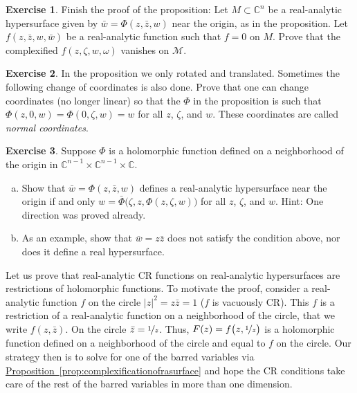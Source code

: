 \documentclass[12pt,openany]{book}
\newcommand{\sabs}[1]{\lvert {#1} \rvert}
\newcommand{\C}{{\mathbb{C}}}
\newcommand{\sM}{{\mathscr{M}}}
\newcommand{\myindex}[1]{#1\index{#1}}
\theoremstyle{plain}
\theoremstyle{remark}
\theoremstyle{definition}
\newenvironment{exbox}{%
    \def\FrameCommand{\vrule width 1pt \relax\hspace{10pt}}%
    \MakeFramed{\advance\hsize-\width\FrameRestore}%
}{%
    \endMakeFramed
}
\newenvironment{exparts}{%
    \leavevmode\begin{enumerate}[a),noitemsep,topsep=0pt,parsep=0pt,partopsep=0pt]
}{%
    \end{enumerate}
}
\theoremstyle{exercise}
\newtheorem{exercise}{Exercise}[section]
\theoremstyle{example}
\newcommand{\propref}[1]{\hyperref[#1]{Proposition~\ref*{#1}}}
\begin{document}
\begin{exbox}
\begin{exercise}
Finish the proof of the proposition:
Let $M\subset \C^n$ be a real-analytic hypersurface given by
$\bar{w} = \Phi(z,\bar{z},w)$ near the origin, as in the proposition.  Let
$f(z,\bar{z},w,\bar{w})$ be a real-analytic function such that $f=0$
on $M$.  Prove that the complexified $f(z,\zeta,w,\omega)$ vanishes on
$\sM$.
\end{exercise}

\begin{exercise}
In the proposition we only rotated and translated.  Sometimes the following
change of coordinates is also done.  Prove that one can change coordinates
(no longer linear) so that the $\Phi$ in the proposition is
such that $\Phi(z,0,w) = \Phi(0,\zeta,w) = w$ for all $z$, $\zeta$, and $w$.
These coordinates are called \emph{\myindex{normal coordinates}}.
\end{exercise}

\begin{exercise}
Suppose
$\Phi$ is a holomorphic function defined on a neighborhood of the origin
in $\C^{n-1} \times \C^{n-1} \times \C$.
\begin{exparts}
\item
Show that $\bar{w} = \Phi(z,\bar{z},w)$ defines a real-analytic hypersurface
near the origin if and only
$w = \bar{\Phi}\bigl(\zeta,z,\Phi(z,\zeta,w)\bigr)$
for all $z$, $\zeta$, and $w$.  Hint: One direction was proved already.
\item
As an example, show that $\bar{w} = z\bar{z}$ does not satisfy the
condition above, nor does it define a real hypersurface.
\end{exparts}
\end{exercise}
\end{exbox}

Let us prove that real-analytic CR functions on real-analytic
hypersurfaces are restrictions
of holomorphic functions.  To motivate the proof, consider
a real-analytic function $f$ on the circle $\sabs{z}^2 = z \bar{z} = 1$
($f$ is vacuously CR).  This $f$
is a restriction of a real-analytic function on a
neighborhood of the circle, that we write $f(z,\bar{z})$.
On the circle
$\bar{z} = \nicefrac{1}{z}$.  Thus,
$F(z) = f\bigl(z,\nicefrac{1}{z}\bigr)$ is a holomorphic function
defined on a neighborhood of the circle and
equal to $f$ on the circle.
Our strategy then is to solve for one of the barred variables via
\propref{prop:complexificationofrasurface} and hope
the CR conditions take care of the rest of the barred variables
in more than one dimension.
\end{document}
